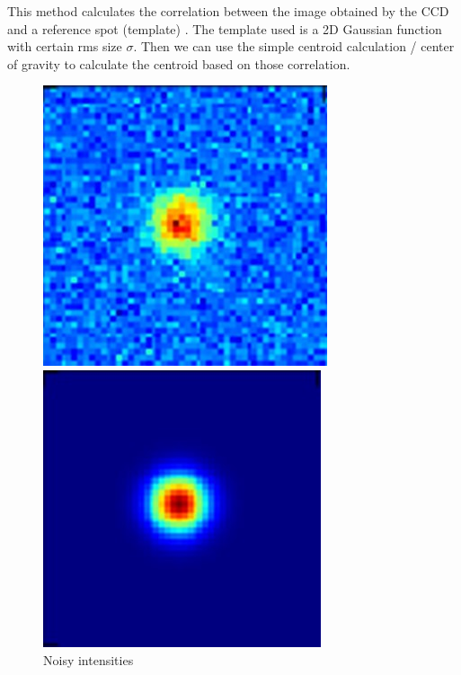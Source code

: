 \documentclass{article}
\begin{document}
This method calculates the correlation between the image obtained by the CCD and a reference spot (template) \cite{poyneer03}. The template used is a 2D Gaussian function with certain rms size $\sigma$. Then we can use the simple centroid calculation / center of gravity to calculate the centroid based on those correlation.

\begin{figure}[H]
\begin{minipage}[t]{0.3\textwidth}
\centering
\includegraphics[width=\linewidth]{figures/noisy}
\caption{Noisy intensities}
\label{fig:noisy}
\end{minipage}
\hspace{\fill}
\begin{minipage}[t]{0.3\textwidth}
\centering
\includegraphics[width=\linewidth]{figures/reference}

\end{minipage}
\end{figure}
\end{document}
